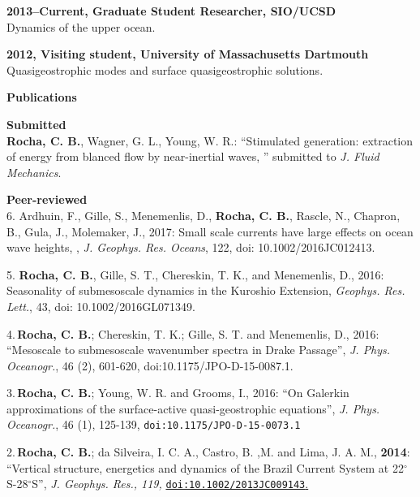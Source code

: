 \documentclass[a4paper,11pt,final]{memoir}
\newcommand{\Sep}{\vspace{1.25em}}
\newcommand{\SmallSep}{\vspace{0.5em}}
\newcommand{\CVSection}[1]
    {\Large\textbf{#1}\par
    \SmallSep\normalsize\normalfont}
\newcommand{\CVItem}[1]
    {\textbf{\color{NavyBlue} #1}}
\begin{document}
\CVItem{2013--Current, Graduate Student Researcher, SIO/UCSD}\\
Dynamics of the upper ocean.
\SmallSep

\CVItem{2012, Visiting student, University of Massachusetts Dartmouth}\\
Quasigeostrophic modes and surface quasigeostrophic solutions.
\SmallSep

%

\Sep

\CVSection{Publications}
\CVItem{Submitted }\\
\textbf{Rocha, C. B.}, Wagner, G. L., Young, W. R.: ``Stimulated generation: extraction of
  energy from blanced flow by near-inertial waves, '' submitted to \textit{J. Fluid Mechanics}.

  \SmallSep

\CVItem{Peer-reviewed}\\
6. Ardhuin, F., Gille, S., Menemenlis, D., \textbf{Rocha, C. B.}, Rascle, N., Chapron, B., Gula, J., Molemaker, J., 2017: Small scale currents have large effects on ocean wave heights,
, \textit{J. Geophys. Res. Oceans}, 122, doi: 10.1002/2016JC012413.

\SmallSep

5.  \textbf{Rocha, C. B.},  Gille, S. T., Chereskin, T. K., and Menemenlis, D., 2016: Seasonality of submesoscale dynamics in the Kuroshio Extension, \textit{Geophys. Res. Lett.}, 43,
doi: 10.1002/2016GL071349.

\SmallSep

4.\,\textbf{Rocha, C. B.};  Chereskin, T. K.; Gille, S. T. and Menemenlis, D., 2016: ``Mesoscale to submesoscale wavenumber spectra in Drake Passage'', \textit{J. Phys. Oceanogr.}, 46 (2), 601-620, doi:10.1175/JPO-D-15-0087.1.

\SmallSep

3.\,\textbf{Rocha, C. B.};  Young, W. R. and Grooms, I., 2016: ``On Galerkin approximations of the surface-active quasi-geostrophic equations'', \textit{J. Phys. Oceanogr.}, 46 (1), 125-139, \texttt{doi:10.1175/JPO-D-15-0073.1}

\SmallSep

2.\,\textbf{Rocha, C. B.};  da Silveira, I. C. A., Castro, B. ,M. and Lima, J. A. M., \textbf{2014}: ``Vertical structure, energetics and dynamics of the Brazil Current System at 22$^\circ$S-28$^\circ$S'', \textit{ J. Geophys. Res., 119,} \href{http://onlinelibrary.wiley.com/doi/10.1002/2013JC009143/abstract}{\texttt{doi:10.1002/2013JC009143}.}
\end{document}
